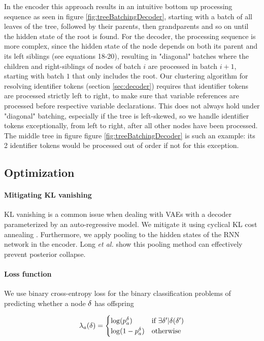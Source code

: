 In the encoder this approach results in an intuitive bottom up processing sequence as seen in figure \ref{fig:treeBatchingDecoder}, starting with a batch of all leaves of the tree, followed by their parents, then grandparents and so on until the hidden state of the root is found.
For the decoder, the processing sequence is more complex, since the hidden state of the node depends on both its parent and its left siblings (see equations 18-20), resulting in "diagonal" batches where the children and right-siblings of nodes of batch $i$ are processed in batch $i+1$, starting with batch $1$ that only includes the root.
Our clustering algorithm for resolving identifier tokens (section \ref{sec:decoder}) requires that identifier tokens are processed strictly left to right, to make sure that variable references are processed before respective variable declarations.
This does not always hold under "diagonal" batching, especially if the tree is left-skewed, so we handle identifier tokens exceptionally, from left to right, after all other nodes have been processed.
The middle tree in figure figure \ref{fig:treeBatchingDecoder} is such an example: its 2 identifier tokens would be processed out of order if not for this exception.

\subsection{Optimization}

\paragraph{Mitigating KL vanishing}
KL vanishing is a common issue when dealing with VAEs with a decoder parameterized by an auto-regressive model.
We mitigate it using cyclical KL cost annealing \cite{fu2019cyclical}. 
Furthermore, we apply pooling to the hidden states of the RNN network in the encoder. Long \textit{et al.} \cite{long2019preventing} show this pooling method can effectively prevent posterior collapse. 

\paragraph{Loss function}
We use binary cross-entropy loss for the binary classification problems of predicting whether a node $\delta$ has offspring

\begin{align}
    \lambda_{a}(\delta) = \begin{cases}
        \log(p^\delta_a) & \text{if }\exists \delta' | \delta(\delta') \\
        \log(1- p^\delta_a) & \text{otherwise}
    \end{cases}
\end{align}

